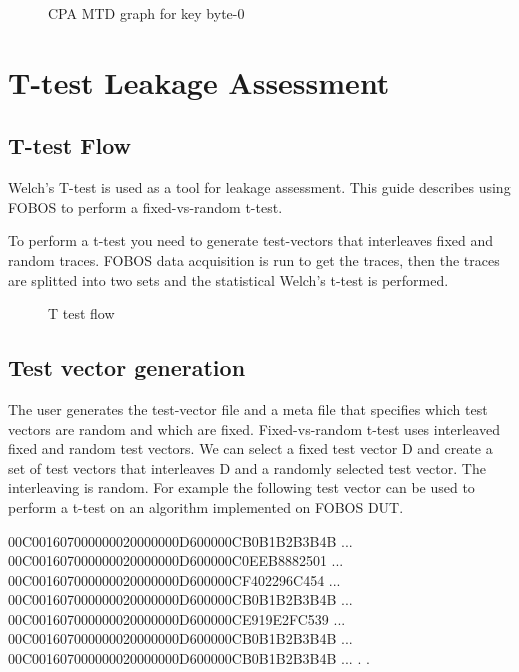 \documentclass[letterpaper,10pt,english]{sphinxmanual}
\let\sphinxpxdimen\pdfpxdimen\else\newdimen\sphinxpxdimen
\begin{document}
\begin{figure}[htbp]
\centering
\capstart

\noindent\sphinxincludegraphics[height=350\sphinxpxdimen]{{cpa_MTD}.png}
\caption{CPA MTD graph for key byte-0}\label{\detokenize{aes_cpa_example2:id3}}\end{figure}


\chapter{T-test Leakage Assessment}
\label{\detokenize{t_test:t-test-leakage-assessment}}\label{\detokenize{t_test::doc}}

\section{T-test Flow}
\label{\detokenize{t_test:t-test-flow}}
Welch’s T-test is used as a tool for leakage assessment. This guide describes using FOBOS to perform a fixed-vs-random t-test.

To perform a t-test you need to generate test-vectors that interleaves fixed and random traces.
FOBOS data acquisition is run to get the traces, then the traces are splitted into two sets and the statistical Welch’s t-test is performed.

\begin{figure}[htbp]
\centering
\capstart

\noindent{}
\caption{T test flow}\label{\detokenize{t_test:id1}}\end{figure}


\section{Test vector generation}
\label{\detokenize{t_test:test-vector-generation}}
The user generates the test-vector file and a meta file that specifies which test vectors are random and which are fixed.
Fixed-vs-random t-test uses interleaved fixed and random test vectors. We can select a fixed test vector D and create a set of test vectors that  interleaves D and a randomly selected test vector. The interleaving is random.
For example the following test vector can be used to perform a t-test on an algorithm implemented on FOBOS DUT.

%
\begin{sphinxVerbatim}[commandchars=\\\{\}]
00C001607000000020000000D600000CB0B1B2B3B4B ...
00C001607000000020000000D600000C0EEB8882501 ...
00C001607000000020000000D600000CF402296C454 ...
00C001607000000020000000D600000CB0B1B2B3B4B ...
00C001607000000020000000D600000CE919E2FC539 ...
00C001607000000020000000D600000CB0B1B2B3B4B ...
00C001607000000020000000D600000CB0B1B2B3B4B ...
.
.
\end{sphinxVerbatim}
\sphinxresetverbatimhllines
\end{document}
